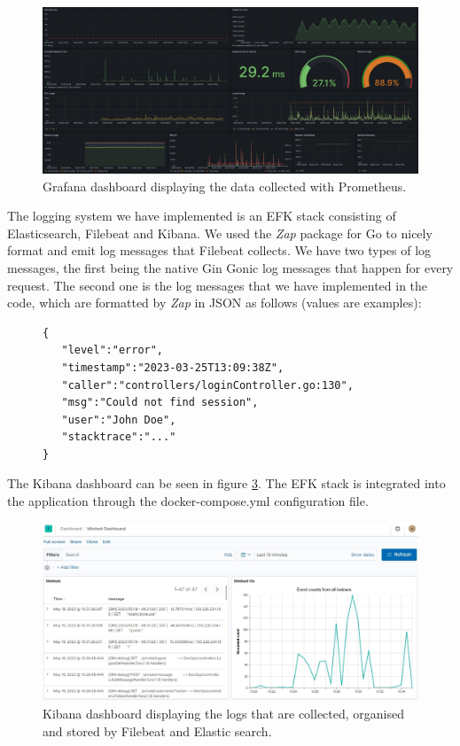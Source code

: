 \begin{figure}[H]
    \centering
    \includegraphics[width=\textwidth]{images/grafana.png}
    \caption{Grafana dashboard displaying the data collected with Prometheus.}
    \label{fig:grafana_dashboard}
\end{figure}

The logging system we have implemented is an EFK stack consisting of Elasticsearch, Filebeat and Kibana. We used the \textit{Zap} package for Go to nicely format and emit log messages that Filebeat collects. We have two types of log messages, the first being the native Gin Gonic log messages that happen for every request. The second one is the log messages that we have implemented in the code, which are formatted by \textit{Zap} in JSON as follows (values are examples):

\begin{figure}[H]
    \begin{footnotesize}
        \begin{verbatim}
{
   "level":"error",
   "timestamp":"2023-03-25T13:09:38Z",
   "caller":"controllers/loginController.go:130",
   "msg":"Could not find session",
   "user":"John Doe",
   "stacktrace":"..."
}
        \end{verbatim}
    \end{footnotesize}
    \label{fig:my_label}
\end{figure}

The Kibana dashboard can be seen in figure \ref{fig:kibana_dashboard}. The EFK stack is integrated into the application through the docker-compose.yml configuration file.

\begin{figure}[H]
    \centering
    \includegraphics[width=\textwidth]{images/kibana.jpg}
    \caption{Kibana dashboard displaying the logs that are collected, organised and stored by Filebeat and Elastic search.}
    \label{fig:kibana_dashboard}
\end{figure}

